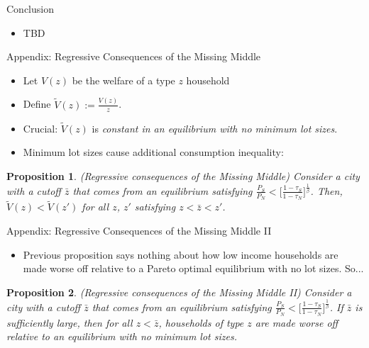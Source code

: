 \documentclass{beamer}
\theoremstyle{plain}
\newtheorem{prop}{Proposition}
\begin{document}
\begin{frame}{Conclusion}
	\begin{itemize}
		\item TBD
	\end{itemize}
\end{frame}

\appendix

\begin{frame}{Appendix: Regressive Consequences of the Missing Middle}
	\begin{itemize}
		\item Let $V(z)$ be the welfare of a type $z$ household
		\item Define $\tilde{V}(z) := \frac{V(z)}{z}$. 
		\item Crucial: $\tilde{V}(z)$ is \textit{constant in an equilibrium with no minimum lot sizes}. 
		\item Minimum lot sizes cause additional consumption inequality: 
	\end{itemize}
\begin{prop}\label{regressive}
	(Regressive consequences of the Missing Middle) Consider a city with a cutoff $\bar{z}$ that comes from an equilibrium satisfying $\frac{P_{S}}{P_{N}} < \bigg[\frac{1-\tau_{S}}{1-\tau_{N}}\bigg]^{\frac{1}{\beta}}$. Then, $\tilde{V}(z) < \tilde{V}(z')$ for all $z$, $z'$ satisfying $z < \bar{z} < z'$.
\end{prop}
\end{frame}

\begin{frame}{Appendix: Regressive Consequences of the Missing Middle II}
\begin{itemize}
	\item Previous proposition says nothing about how low income households are made worse off relative to a Pareto optimal equilibrium with no lot sizes. So... \pause
\end{itemize}
\begin{prop}\label{regressiveII}
	(Regressive consequences of the Missing Middle II) Consider a city with a cutoff $\bar{z}$ that comes from an equilibrium satisfying  $\frac{P_{S}}{P_{N}} < \bigg[\frac{1-\tau_{S}}{1-\tau_{N}}\bigg]^{\frac{1}{\beta}}$. If $\bar{z}$ is sufficiently large, then for all $z < \bar{z}$, households of type $z$ are made worse off relative to an equilibrium with no minimum lot sizes. 
\end{prop}
\end{frame}


\end{document}
